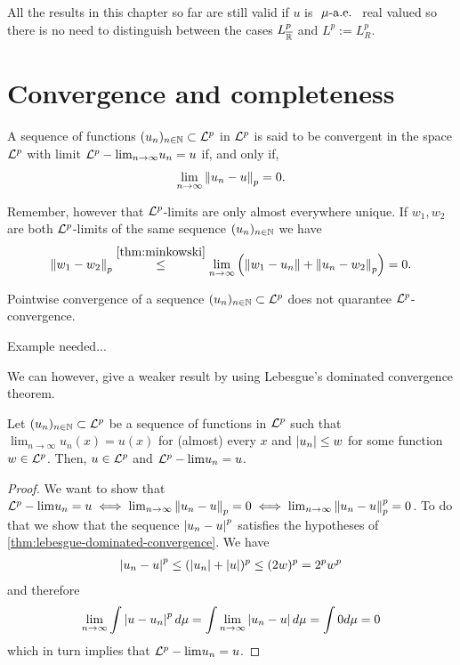 All the results in this chapter so far are still valid if $u$ is $\ \mu\text{-a.e. }$ real valued so there is no need to distinguish between the cases $L^p_{\overline{\mathbb{R}}}$ and $L^p := L^p_R$.

\section{Convergence and completeness}

\begin{dfn}[$\Lp$-convergence]
	\label{dfn:lp-convergence}
	A sequence of functions $(u_n)_{n\in\mathbb{N}} \subset \mathcal{L}^p$ in $\Lp$ is said to be convergent in the space $\Lp$ with limit ${\mathcal{L}^p-\lim}_{n\to\infty} u_n = u$ if, and only if,
	\begin{align}
		\lim_{n\to\infty} \left\Vert{u_n - u}\right\Vert_p = 0.
	\end{align}
\end{dfn}

Remember, however that $\Lp$-limits are only almost everywhere unique. If $w_1, w_2$ are both $\Lp$-limits of the same sequence $(u_n)_{n\in\mathbb{N}}$ we have
\begin{align*}
	\left\Vert{w_1 - w_2}\right\Vert_p
	\overset{\ref{thm:minkowski}}{\leq}\lim_{n\to\infty} \left( \left\Vert{w_1 - u_n}\right\Vert + \left\Vert{u_n - w_2}\right\Vert_p \right) = 0.
\end{align*}

\begin{remark}
	Pointwise convergence of a sequence $(u_n)_{n\in\mathbb{N}} \subset \mathcal{L}^p$ does not quarantee $\Lp$-convergence.
	
	Example needed...
\end{remark}

We can however, give a weaker result by using Lebesgue's dominated convergence theorem.

\begin{lem}
	Let $(u_n)_{n\in\mathbb{N}} \subset \mathcal{L}^p$ be a sequence of functions in $\Lp$ such that $\lim_{n\to\infty} u_n(x) =  u(x)$ for (almost) every $x$ and $\left\vert{u_n}\right\vert \leq w$ for some function $w \in \mathcal{L}^p$. Then, $u \in \mathcal{L}^p$ and ${\mathcal{L}^p-\lim} u_n = u$.
\end{lem}

\begin{proof}
	We want to show that ${\mathcal{L}^p-\lim} u_n = u \iff \lim_{n\to\infty} \left\Vert{u_n - u}\right\Vert_p = 0 \iff \lim_{n\to\infty} \left\Vert{u_n - u}\right\Vert_p^p = 0$. To do that we show that the sequence $\left\vert{u_n - u}\right\vert^p$ satisfies the hypotheses of \autoref{thm:lebesgue-dominated-convergence}. We have 
	\begin{align*}
	\left\vert{u_n - u}\right\vert^p \leq (\left\vert{u_n}\right\vert + \left\vert{u}\right\vert)^p \leq (2w)^p = 2^p w^p
	\end{align*}
	and therefore
	\begin{align*}
	\lim_{n\to\infty} \int \left\vert{u - u_n}\right\vert^p d \mu
	= \int \lim_{n\to \infty} \left\vert{u_n - u}\right\vert d \mu
	= \int 0d\mu = 0
	\end{align*}
	which in turn implies that ${\mathcal{L}^p-\lim} u_n = u$.
\end{proof}

